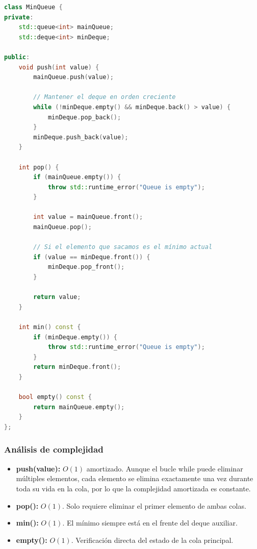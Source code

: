 \documentclass[12pt,a4paper]{article}
\begin{document}
\begin{lstlisting}[language=C++, label=lst:minqueue_simple, caption={MaxMinQueue.hpp - Implementación básica de MinQueue con complejidad O(1) amortizado}]
class MinQueue {
private:
    std::queue<int> mainQueue;
    std::deque<int> minDeque;

public:
    void push(int value) {
        mainQueue.push(value);
        
        // Mantener el deque en orden creciente
        while (!minDeque.empty() && minDeque.back() > value) {
            minDeque.pop_back();
        }
        minDeque.push_back(value);
    }
    
    int pop() {
        if (mainQueue.empty()) {
            throw std::runtime_error("Queue is empty");
        }
        
        int value = mainQueue.front();
        mainQueue.pop();
        
        // Si el elemento que sacamos es el mínimo actual
        if (value == minDeque.front()) {
            minDeque.pop_front();
        }
        
        return value;
    }
    
    int min() const {
        if (minDeque.empty()) {
            throw std::runtime_error("Queue is empty");
        }
        return minDeque.front();
    }
    
    bool empty() const {
        return mainQueue.empty();
    }
};
\end{lstlisting}

\subsubsection{Análisis de complejidad}

\begin{itemize}
    \item \textbf{push(value):} $O(1)$ amortizado. Aunque el bucle while puede eliminar múltiples elementos, cada elemento se elimina exactamente una vez durante toda su vida en la cola, por lo que la complejidad amortizada es constante.
    
    \item \textbf{pop():} $O(1)$. Solo requiere eliminar el primer elemento de ambas colas.
    
    \item \textbf{min():} $O(1)$. El mínimo siempre está en el frente del deque auxiliar.
    
    \item \textbf{empty():} $O(1)$. Verificación directa del estado de la cola principal.
\end{itemize}
\end{document}
